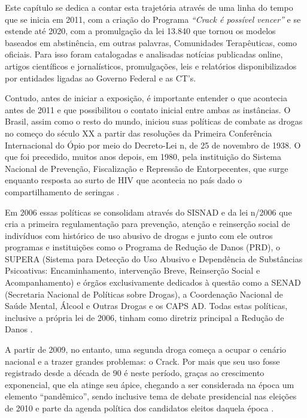 \documentclass[
	12pt,				%
	oneside,			%
	a4paper,			%
	sumario=tradicional,
	english,			%
	brazil				%
	]{abntex2}
\begin{document}
Este capítulo se dedica a contar esta trajetória através de uma linha do tempo que se inicia em 2011, com a criação do Programa \emph{``Crack é possível vencer''} e se estende até 2020, com a promulgação da lei 13.840 que tornou os modelos baseados em abstinência, em outras palavras, Comunidades Terapêuticas, como oficiais. Para isso foram catalogadas e analisadas notícias publicadas online, artigos científicos e jornalísticos, promulgações, leis e relatórios disponibilizados por entidades ligadas ao Governo Federal e as CT's.

Contudo, antes de iniciar a exposição, é importante entender o que acontecia antes de 2011 e que possibilitou o contato inicial entre ambas as instâncias. O Brasil, assim como o resto do mundo, iniciou suas políticas de combate as drogas no começo do século XX a partir das resoluções da Primeira Conferência Internacional do Ópio \autocite{fiore_o_2012} por meio do Decreto-Lei n, de 25 de novembro de 1938. O que foi precedido, muitos anos depois, em 1980, pela instituição do Sistema Nacional de Prevenção, Fiscalização e Repressão de Entorpecentes, que surge enquanto resposta ao surto de \acrshort{HIV} que acontecia no país dado o compartilhamento de seringas \autocite{andrade_reflexoes_2011-2}.

Em 2006 essas políticas se consolidam através do SISNAD e da lei n/2006 que cria a primeira regulamentação para prevenção, atenção e reinserção social de indivíduos com histórico de uso abusivo de drogas e junto com ele outros programas e instituições como o Programa de Redução de Danos (\acrshort{PRD}), o \acrshort{SUPERA} (Sistema para Detecção do Uso Abusivo e Dependência de Substâncias Psicoativas: Encaminhamento, intervenção Breve, Reinserção Social e Acompanhamento) e órgãos exclusivamente dedicados à questão como a \acrshort{SENAD} (Secretaria Nacional de Políticas sobre Drogas), a Coordenação Nacional de Saúde Mental, Álcool e Outras Drogas e os \acrshort{CAPS AD}. Todas estas políticas, inclusive a própria lei de 2006, tinham como diretriz principal a Redução de Danos \autocite{andrade_reflexoes_2011-2}.

A partir de 2009, no entanto, uma segunda droga começa a ocupar o cenário nacional e a trazer grandes problemas: o Crack. Por mais que seu uso fosse registrado desde a década de 90 é neste período, graças ao crescimento exponencial, que ela atinge seu ápice, chegando a ser considerada na época um elemento ``pandêmico'', sendo inclusive tema de debate presidencial nas eleições de 2010 e parte da agenda política dos candidatos eleitos daquela época \autocite[198]{mattos_crack_2017}.
\end{document}
